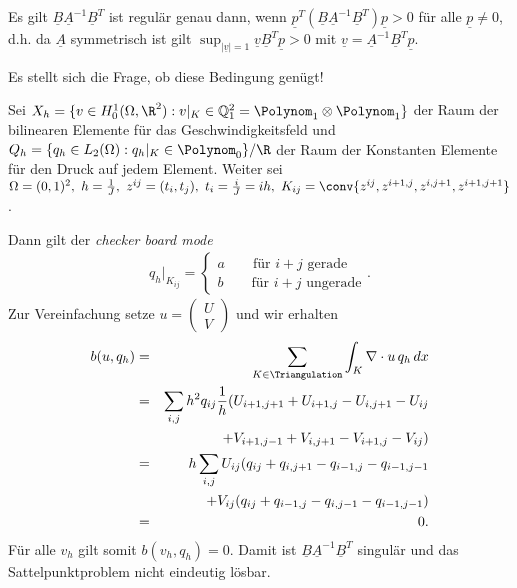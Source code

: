 \begin{Bemerkung}
    Es gilt $\underline B \underline A^{-1} \underline B^T$ ist regulär genau
    dann, wenn $\underline p^T (\underline B \underline A^{-1} \underline B^T)
    \underline p > 0$ für alle $\underline p \neq 0$, d.h. da
    $\underline A$ symmetrisch ist gilt
    $\sup_{|\underline v| = 1} \underline v \underline B^T \underline p > 0$ mit
    $\underline v = \underline A^{-1} \underline B^T \underline p$.
\end{Bemerkung}

Es stellt sich die Frage, ob diese Bedingung genügt!

\begin{Beispiel}
    Sei $X_h = \{v\in H_0^1(\Omega, \R^2): v|_K\in \mathbb Q_1^2 =
    \Polynom_1 \otimes \Polynom_1\}$ der Raum der bilinearen Elemente für das
    Geschwindigkeitsfeld und
    $Q_h = \{q_h\in L_2(\Omega): q_h|_K\in \Polynom_0\} / \R$ der Raum
    der Konstanten Elemente für den Druck auf jedem Element.
    Weiter sei $\Omega = (0, 1)^2, \ h = \frac{1}{J}, \ z^{ij} = (t_i, t_j), \
    t_i = \frac{i}{J} = i h, \ K_{ij} = \conv\{z^{ij}, z^{i+1,j}, z^{i,j+1},
    z^{i+1,j+1}\}$.

    Dann gilt der \emph{checker board mode}
    \begin{eqnarray*}
        q_h|_{K_{ij}} = \begin{cases}
                            a \qquad \text{für } i + j \text{ gerade} \\
                            b \qquad \text{für } i + j \text{ ungerade}
                        \end{cases}.
    \end{eqnarray*}
    Zur Vereinfachung setze $u = \left(\begin{smallmatrix}
                                    U \\
                                    V
                                \end{smallmatrix}\right)$
    und wir erhalten
    \begin{eqnarray*}
            b(u, q_h)
        &=& \sum_{K\in \Triangulation} \int_K \nabla \cdot u \, q_h \,dx \\
        &=& \sum_{i,j} h^2 q_{ij} \frac{1}{h} (U_{i+1,j+1} + U_{i+1,j} -
            U_{i,j+1} - U_{ij} \\
            &&+ V_{i+1,j-1} + V_{i,j+1} - V_{i+1,j} - V_{ij})\\
        &=& h \sum_{i,j} U_{ij} (q_{ij} + q_{i,j+1} - q_{i-1,j} - q_{i-1,j-1} \\
            &&+ V_{ij} (q_{ij} + q_{i-1,j} - q_{i,j-1} - q_{i-1,j-1}) \\
        &=& 0.
    \end{eqnarray*}
    Für alle $v_h$ gilt somit $b(v_h, q_h) = 0$. Damit ist $\underline B
    \underline A^{-1} \underline B^T$ singulär und das Sattelpunktproblem
    nicht eindeutig lösbar.
\end{Beispiel}


